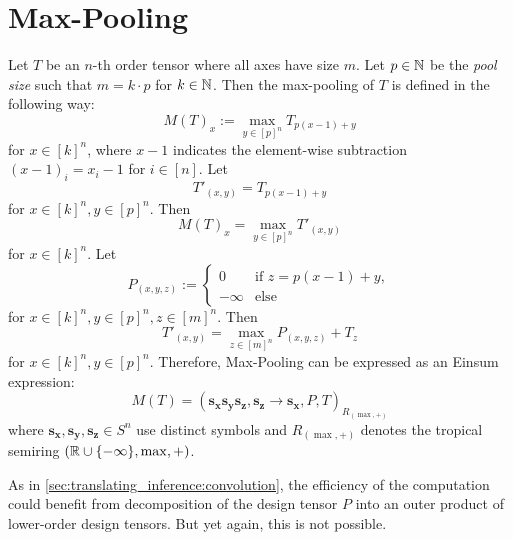 \section{Max-Pooling}

Let $T$ be an $n$-th order tensor where all axes have size $m$.
Let $p \in \mathbb{N}$ be the \textit{pool size} such that $m = k \cdot p$ for $k \in \mathbb{N}$.
Then the max-pooling of $T$ is defined in the following way:
$$M(T)_{x} := \max\limits_{y \in [p]^n} T_{p (x - 1) + y}$$
for $x \in [k]^n$, where $x - 1$ indicates the element-wise subtraction $(x - 1)_i = x_i - 1$ for $i \in [n]$.
Let
$$T'_{(x,y)} = T_{p (x - 1) + y}$$
for $x \in [k]^n, y \in [p]^n$.
Then
$$M(T)_{x} = \max\limits_{y \in [p]^n} T'_{(x,y)}$$
for $x \in [k]^n$. Let
$$P_{(x,y,z)} := \begin{cases}
        0       & \text{if $z = p (x - 1) + y$}, \\
        -\infty & \text{else}
    \end{cases}$$
for $x \in [k]^n, y \in [p]^n, z \in [m]^n$.
Then
$$T'_{(x,y)} = \max\limits_{z \in [m]^n} P_{(x,y,z)} + T_{z}$$
for $x \in [k]^n, y \in [p]^n$.
Therefore, Max-Pooling can be expressed as an Einsum expression:
$$M(T) = (\bm{s_x}\bm{s_y}\bm{s_z}, \bm{s_z}  \rightarrow \bm{s_x}, P, T)_{R_{(\max, +)}}$$
where $\bm{s_x},\bm{s_y},\bm{s_z} \in S^n$ use distinct symbols and $R_{(\max, +)}$ denotes the tropical semiring $(\mathbb{R} \cup \lbrace -\infty \rbrace, \max, +)$.

As in \cref{sec:translating_inference:convolution}, the efficiency of the computation could benefit from decomposition of the design tensor $P$ into an outer product of lower-order design tensors.
But yet again, this is not possible.

